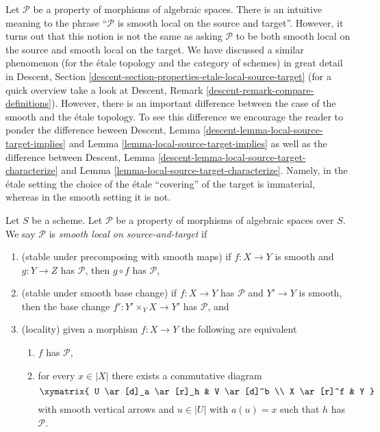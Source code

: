 \noindent
Let $\mathcal{P}$ be a property of morphisms of algebraic spaces. There is an
intuitive meaning to the phrase ``$\mathcal{P}$ is smooth local on the
source and target''. However, it turns out that this notion is not
the same as asking $\mathcal{P}$ to be both smooth
local on the source and smooth local on the target.
We have discussed a similar phenomenon (for the \'etale topology and
the category of schemes) in great detail in
Descent, Section \ref{descent-section-properties-etale-local-source-target}
(for a quick overview take a look at
Descent, Remark \ref{descent-remark-compare-definitions}).
However, there is an important difference between the case of the smooth
and the \'etale topology. To see this difference we encourage the reader
to ponder the difference beween
Descent, Lemma \ref{descent-lemma-local-source-target-implies}
and
Lemma \ref{lemma-local-source-target-implies}
as well as the difference between
Descent, Lemma \ref{descent-lemma-local-source-target-characterize}
and
Lemma \ref{lemma-local-source-target-characterize}.
Namely, in the \'etale setting the choice of the \'etale ``covering'' of the
target is immaterial, whereas in the smooth setting it is not.

\begin{definition}
\label{definition-local-source-target}
Let $S$ be a scheme.
Let $\mathcal{P}$ be a property of morphisms of algebraic spaces over $S$.
We say $\mathcal{P}$ is {\it smooth local on source-and-target} if
\begin{enumerate}
\item (stable under precomposing with smooth maps)
if $f : X \to Y$ is smooth and $g : Y \to Z$ has $\mathcal{P}$,
then $g \circ f$ has $\mathcal{P}$,
\item (stable under smooth base change)
if $f : X \to Y$ has $\mathcal{P}$ and $Y' \to Y$ is smooth, then
the base change $f' : Y' \times_Y X \to Y'$ has $\mathcal{P}$, and
\item (locality) given a morphism $f : X \to Y$ the following are
equivalent
\begin{enumerate}
\item $f$ has $\mathcal{P}$,
\item for every $x \in |X|$ there exists a commutative diagram
$$
\xymatrix{
U \ar[d]_a \ar[r]_h & V \ar[d]^b \\
X \ar[r]^f & Y
}
$$
with smooth vertical arrows and $u \in |U|$ with $a(u) = x$ such that
$h$ has $\mathcal{P}$.
\end{enumerate}
\end{enumerate}
\end{definition}

